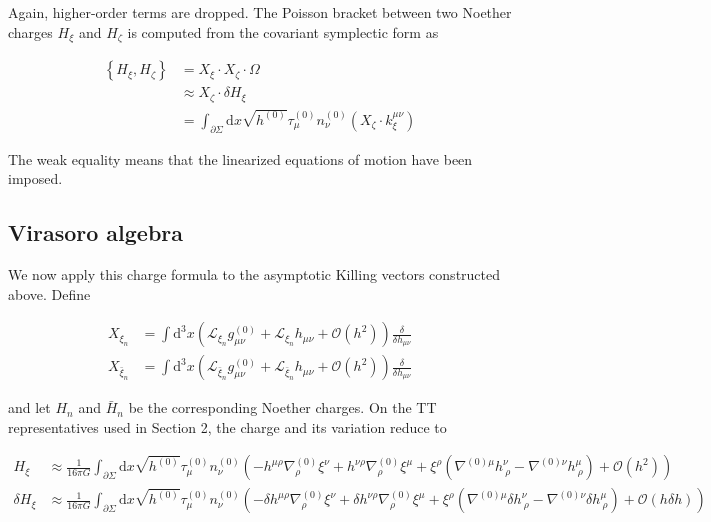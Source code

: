 Again, higher-order terms are dropped. The Poisson bracket between two Noether charges \(H_{\xi}\) and \(H_{\zeta}\) is computed from the covariant symplectic form as

\begin{align}
\left\{H_{\xi},H_{\zeta}\right\} & =X_{\xi}\cdot X_{\zeta}\cdot \Omega \\
 & \approx X_{\zeta}\cdot \delta H_{\xi} \\
 & =\int _{\partial \Sigma}\mathrm{d}x\sqrt{ h^{(0)} }\tau ^{(0)}_{\mu}n^{(0)}_{\nu}(X_{\zeta}\cdot k _{\xi}^{\mu \nu})
\end{align}

The weak equality means that the linearized equations of motion have been imposed.

\subsection{Virasoro algebra}\label{virasoro-algebra-1}

We now apply this charge formula to the asymptotic Killing vectors constructed above. Define

\begin{align}
X_{\xi _{n}} & =\int \mathrm{d}^{3}x\left(\mathcal{L}_{\xi _{n}}g^{(0)}_{\mu \nu}+\mathcal{L}_{\xi _{n}}h_{\mu \nu}+\mathcal{O}(h^{2})\right) \frac{\delta}{\delta h_{\mu \nu}} \\
X_{\bar{\xi}_{n}} & =\int \mathrm{d}^{3}x\left(\mathcal{L}_{\bar{\xi}_{n}}g^{(0)}_{\mu \nu}+\mathcal{L}_{\bar{\xi}_{n}}h_{\mu \nu}+\mathcal{O}(h^{2})\right) \frac{\delta}{\delta h_{\mu \nu}}
\end{align}

and let \(H_{n}\) and \(\bar{H}_{n}\) be the corresponding Noether charges. On the TT representatives used in Section 2, the charge and its variation reduce to

\begin{align}
H_{\xi} & \approx \frac{1}{16\pi G}\int _{\partial \Sigma}\mathrm{d}x\sqrt{ h^{(0)} }\tau ^{(0)}_{\mu}n^{(0)}_{\nu}\left(-h^{\mu \rho}\nabla ^{(0)}_{\rho}\xi ^{\nu}+h^{\nu \rho}\nabla ^{(0)}_{\rho}\xi ^{\mu}+\xi ^{\rho}\left(\nabla ^{(0)\mu}h^{\nu}_{~\rho}-\nabla ^{(0)\nu}h^{\mu}_{~\rho}\right)+\mathcal{O}(h^{2})\right) \\
\delta H_{\xi} & \approx \frac{1}{16\pi G}\int _{\partial \Sigma}\mathrm{d}x\sqrt{ h^{(0)} }\tau _{\mu}^{(0)}n_{\nu}^{(0)}\left(-\delta h^{\mu \rho}\nabla ^{(0)}_{\rho}\xi ^{\nu}+\delta h^{\nu \rho}\nabla ^{(0)}_{\rho}\xi ^{\mu}+\xi ^{\rho}(\nabla ^{(0)\mu}\delta h^{\nu}_{~\rho}-\nabla ^{(0)\nu}\delta h^{\mu}_{~\rho})+\mathcal{O}(h\delta h)\right)
\end{align}

